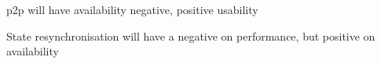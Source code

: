 

\begin{description}[style=nextline]
  \item[T1\label{t1}] \gls{p2p} will have availability negative, positive usability
  \item[T2\label{t2}] State resynchronisation will have a negative on performance, but positive on availability
\end{description}
